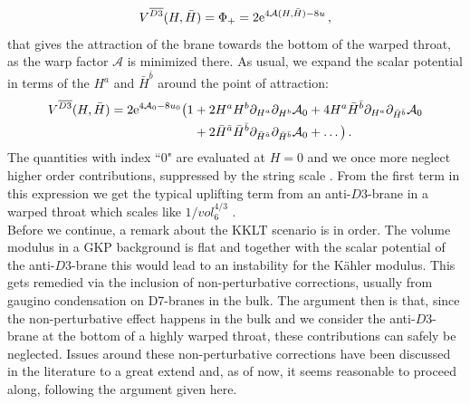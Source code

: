 \documentclass[a4paper,12pt]{report}
\newcommand{\be}{\begin{equation}}
\newcommand{\ee}{\end{equation}}
\newcommand{\bea}{\begin{equation}\begin{aligned}}
\newcommand{\eea}{\end{aligned}\end{equation}}
\def\rme{{\rm e}}
\begin{document}
\be 
V^{\overline{D3}}(H,\bar{H}) = \Phi_+ = 2 \rme^{4\mathcal{A}(H,\bar{H})-8u}\,,
\label{eq:barD3scalpotorig}
\ee
that gives the attraction of the brane towards the bottom of the warped throat, as the warp factor $\mathcal{A}$ is minimized there. As usual, we expand the scalar potential in terms of the $H^a$ and $\bar{H}^{\bar{b}}$ around the point of attraction:
\bea 
V^{\overline{D3}}(H,\bar{H}) = 2 \rme^{4 \mathcal{A}_0-8u_0} \big( 1 &+ 2 H^a H^b \partial_{H^a} \partial_{H^b} \mathcal{A}_0 + 4 H^a \bar{H}^{\bar{b}} \partial_{H^a} \partial_{\bar{H}^{\bar{b}}} \mathcal{A}_0  \\&+ 2 \bar{H}^{\bar{a}} \bar{H}^{\bar{b}} \partial_{\bar{H}^{\bar{a}}} \partial_{\bar{H}^{\bar{b}}} \mathcal{A}_0 + \ldots \big)\,.
\eea
The quantities with index ``$0$" are evaluated at $H=0$ and we once more neglect higher order contributions, suppressed by the string scale \cite{McGuirk:2012sb}. From the first term in this expression we get the typical uplifting term from an anti-$D3$-brane in a warped throat which scales like $1/vol_6^{4/3}$ \cite{Kachru:2003sx}.\\
Before we continue, a remark about the KKLT scenario is in order. The volume modulus in a GKP background is flat and together with the scalar potential of the anti-$D3$-brane this would lead to an instability for the Kähler modulus. This gets remedied via the inclusion of non-perturbative corrections, usually from gaugino condensation on D7-branes in the bulk. The argument then is that, since the non-perturbative effect happens in the bulk and we consider the anti-$D3$-brane at the bottom of a highly warped throat, these contributions can safely be neglected. Issues around these non-perturbative corrections have been discussed in the literature to a great extend \cite{Moritz:2017xto,Moritz:2018sui,Kallosh:2018wme,Moritz:2018ani,Kallosh:2018psh,Gautason:2018gln,Hamada:2018qef,Kallosh:2019axr,Kallosh:2019oxv,Hamada:2019ack,Carta:2019rhx,Gautason:2019jwq,Kachru:2019dvo} and, as of now, it seems reasonable to proceed along, following the argument given here.
\end{document}
